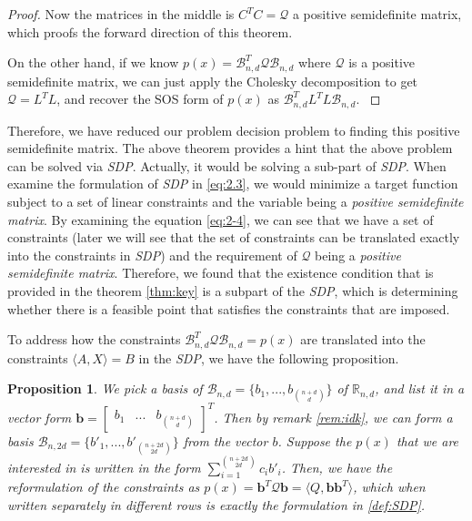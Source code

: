 \documentclass[12pt]{amsart}
\numberwithin{equation}{section}
\newtheorem{prop}[thm]{Proposition}
\theoremstyle{definition}
\numberwithin{thm}{section}
\begin{document}
\begin{proof}
     Now the matrices in the middle is $C^T C = \mathcal{Q}$ a positive semidefinite matrix, which proofs the forward direction of this theorem.

     On the other hand, if we know $p(x) = \mathcal{B}_{n, d}^T \mathcal{Q} \mathcal{B}_{n, d}$ where $\mathcal{Q}$ is a positive semidefinite matrix, 
     we can just apply the Cholesky decomposition to get $\mathcal{Q} = L^T L$, and recover the SOS form of $p(x)$ as
     $\mathcal{B}_{n, d}^T L^T L \mathcal{B}_{n, d}$. \cite{Blekherman:Parrilo:Thomas}
\end{proof}

\smallskip
Therefore, we have reduced our problem decision problem to finding this positive semidefinite matrix. 
The above theorem provides a hint that the above problem can be solved via \emph{SDP}. Actually, it would be solving a sub-part of \emph{SDP}.
When examine the formulation of \emph{SDP} in \ref{eq:2.3}, we would minimize a target function subject to a set of linear constraints and the variable being a \emph{positive semidefinite matrix}. 
By examining the equation \ref{eq:2-4}, we can see that we have a set of constraints (later we will see that the set of constraints can be translated exactly into the constraints in \emph{SDP}) 
and the requirement of $\mathcal{Q}$ being a \emph{positive semidefinite matrix}. 
Therefore, we found that the existence condition that is provided in the theorem \ref{thm:key} is a subpart of the \emph{SDP}, 
which is determining whether there is a feasible point that satisfies the constraints that are imposed. 

To address how the constraints $\mathcal{B}_{n, d} ^ T \mathcal{Q} \mathcal{B}_{n, d} = p(x)$ are translated into the constraints $\langle A, X \rangle = B$ in the \emph{SDP}, we have the following proposition.
\begin{prop}
     \label{prop:2.19}
     We pick a basis of $\mathcal{B}_{n, d} = \{b_1, ..., b_{n + d \choose d}\}$ of $\mathbb{R}_{n, d}$, and list it in a vector form $ \mathbf{b} =\begin{bmatrix}
          b_1 &
          ... &
          b_{ n+ d \choose d}
     \end{bmatrix} ^ T$. Then by remark \ref{rem:idk}, we can form a basis $\mathcal{B}_{n, 2d} = \{b'_1, ..., b'_{n + 2d \choose 2d}\}$ from the vector $b$. 
     Suppose the $p(x)$ that we are interested in is written in the form $\sum_{i = 1}^{n + 2d \choose 2d } c_i b'_i$.
     Then, we have the reformulation of the constraints as $p(x) = \mathbf{b}^T \mathcal{Q} \mathbf{b} = \langle Q, \mathbf{bb}^T \rangle$, 
     which when written separately in different rows is exactly the formulation in \ref{def:SDP}.
\end{prop}
\end{document}
